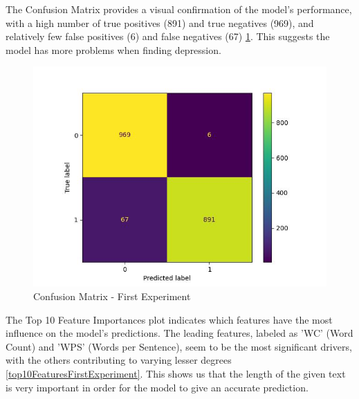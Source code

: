 The Confusion Matrix provides a visual confirmation of the model's performance, with a high number of true positives (891) and true negatives (969), and relatively few false positives (6) and false negatives (67) \ref{confusionMatrixFirstExperiment}. This suggests the model has more problems when finding depression.

\begin{figure}[htbp]
	\centering
		\includegraphics[scale=0.8]{LaTeX Bachelor Thesis Depression Signs Detection/figures/metrics/experiment1English/confusionMatrix.jpg}
	\caption{Confusion Matrix - First Experiment}
	\label{confusionMatrixFirstExperiment}
\end{figure}



The Top 10 Feature Importances plot indicates which features have the most influence on the model's predictions. The leading features, labeled as 'WC' (Word Count) and 'WPS' (Words per Sentence), seem to be the most significant drivers, with the others contributing to varying lesser degrees \ref{top10FeaturesFirstExperiment}. This shows us that the length of the given text is very important in order for the model to give an accurate prediction.

